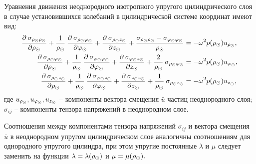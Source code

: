 Уравнения движения неоднородного изотропного упругого цилиндрического слоя в случае установившихся колебаний в цилиндрической системе координат имеют вид:
\begin{equation}\label{equation_dvij_splosh_sred}
\begin{aligned}
\frac{\partial\:\sigma_{\rho_\odot\rho_\odot}}{
\partial \rho_\odot}+\frac{1}{\rho_\odot}\:\frac{\partial\:\sigma_{\rho_\odot\varphi_\odot}}{\partial\varphi_\odot}+\frac{\partial\:\sigma_{\rho_\odot z_\odot}}{\partial z_\odot}+\frac{\sigma_{\rho_\odot\rho_\odot}-\sigma_{\varphi_\odot\varphi_\odot}}{\rho_\odot}&=-\omega^2 p(\rho_\odot)u_{\rho_\odot},\\
\frac{\partial\:\sigma_{\rho_\odot\varphi_\odot}}{
\partial \rho_\odot}+\frac{1}{\rho_\odot}\:\frac{\partial\:\sigma_{\varphi_\odot\varphi_\odot}}{\partial\varphi_\odot}+\frac{\partial\:\sigma_{\varphi_\odot z_\odot}}{\partial z_\odot}+\frac{2}{\rho_\odot}\:\sigma_{\rho_\odot\varphi_\odot}&=-\omega^2 p(\rho_\odot)u_{\varphi_\odot},\\
\frac{\partial\:\sigma_{\rho_\odot z_\odot}}{
\partial \rho_\odot}+\frac{1}{\rho_\odot}\:\frac{\partial\:\sigma_{\varphi_\odot z_\odot}}{\partial\varphi_\odot}+\frac{\partial\:\sigma_{z_\odot z_\odot}}{\partial z_\odot}+\frac{1}{\rho_\odot}\:\sigma_{\rho_\odot z_\odot}&=-\omega^2 p(\rho_\odot)u_{z_\odot},
\end{aligned}
\end{equation}
где $u_{\rho_\odot}, u_{\varphi_\odot}, u_{z_\odot}$ -- компоненты вектора смещения $\bar{u}$ частиц неоднородного слоя; 
\newline
$\sigma_{ij}$ -- компоненты тензора напряжений в неоднородном слое.

Соотношения между компонентами тензора напряжений $\sigma_{ij}$ и вектора смещения $\bar{u}$ в неоднородном упругом цилиндрическом слое аналогичны соотношениям для однородного упругого цилиндра, при этом упругие постоянные $\lambda$ и $\mu$ следует заменить на функции $\lambda=\lambda(\rho_\odot)$ и $\mu=\mu(\rho_\odot).$

